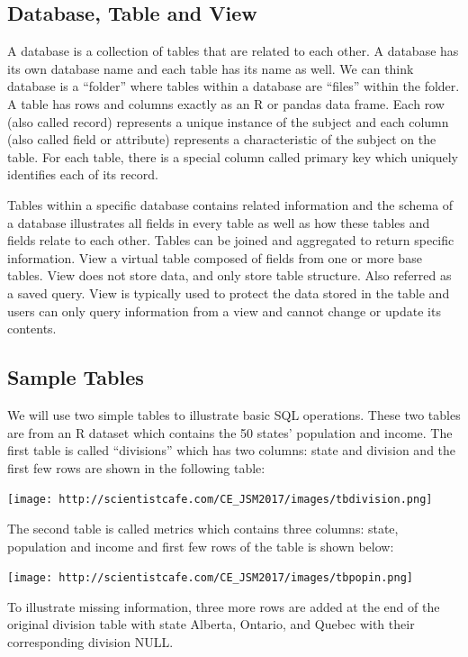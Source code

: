 \documentclass[]{book}
\theoremstyle{definition}
\theoremstyle{definition}
\theoremstyle{remark}
\begin{document}
\subsection{Database, Table and View}\label{database-table-and-view}

A database is a collection of tables that are related to each other. A
database has its own database name and each table has its name as well.
We can think database is a ``folder'' where tables within a database are
``files'' within the folder. A table has rows and columns exactly as an
R or pandas data frame. Each row (also called record) represents a
unique instance of the subject and each column (also called field or
attribute) represents a characteristic of the subject on the table. For
each table, there is a special column called primary key which uniquely
identifies each of its record.

Tables within a specific database contains related information and the
schema of a database illustrates all fields in every table as well as
how these tables and fields relate to each other. Tables can be joined
and aggregated to return specific information. View a virtual table
composed of fields from one or more base tables. View does not store
data, and only store table structure. Also referred as a saved query.
View is typically used to protect the data stored in the table and users
can only query information from a view and cannot change or update its
contents.

\subsection{Sample Tables}\label{sample-tables}

We will use two simple tables to illustrate basic SQL operations. These
two tables are from an R dataset which contains the 50 states'
population and income. The first table is called ``divisions'' which has
two columns: state and division and the first few rows are shown in the
following table:

\texttt{[image: http://scientistcafe.com/CE\_JSM2017/images/tbdivision.png]}

The second table is called metrics which contains three columns: state,
population and income and first few rows of the table is shown below:

\texttt{[image: http://scientistcafe.com/CE\_JSM2017/images/tbpopin.png]}

To illustrate missing information, three more rows are added at the end
of the original division table with state Alberta, Ontario, and Quebec
with their corresponding division NULL.
\end{document}
